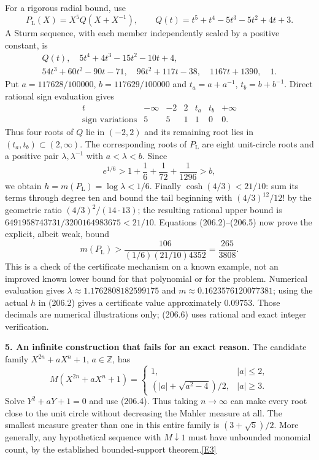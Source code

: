 \documentclass[11pt,a4paper]{article}
\newcommand{\Z}{\mathbb{Z}}
\newcommand{\eref}[2]{\hyperlink{extra:#1:#2}{[E#2]}}
\begin{document}
For a rigorous radial bound, use
\[
 P_\mathrm L(X)=X^5 Q(X+X^{-1}),\qquad
 Q(t)=t^5+t^4-5t^3-5t^2+4t+3.
\]
A Sturm sequence, with each member independently scaled by a positive
constant, is
\[
\begin{gathered}
 Q(t),\quad 5t^4+4t^3-15t^2-10t+4,\\
 54t^3+60t^2-90t-71,\quad96t^2+117t-38,
 \quad1167t+1390,\quad1.
\end{gathered}
\]
Put $a=117628/100000$, $b=117629/100000$ and
$t_a=a+a^{-1}$, $t_b=b+b^{-1}$. Direct rational sign evaluation gives
\[
\begin{array}{c|rrrrrr}
 t&-\infty&-2&2&t_a&t_b&+\infty\\\hline
 \text{sign variations}&5&5&1&1&0&0.
\end{array}
\]
Thus four roots of $Q$ lie in $(-2,2)$ and its remaining root lies in
$(t_a,t_b)\subset(2,\infty)$. The corresponding roots of $P_\mathrm L$
are eight unit-circle roots and a positive pair $\lambda,\lambda^{-1}$
with $a<\lambda<b$. Since
\[
 e^{1/6}>1+\frac16+\frac1{72}+\frac1{1296}>b,
\]
we obtain $h=m(P_\mathrm L)=\log\lambda<1/6$.
Finally $\cosh(4/3)<21/10$: sum its terms through degree ten and bound
the tail beginning with $(4/3)^{12}/12!$ by the geometric ratio
$(4/3)^2/(14\cdot13)$; the resulting rational upper bound is
$6491958743731/3200164983675<21/10$.
Equations (206.2)--(206.5) now prove the explicit, albeit weak, bound
\[
 m(P_\mathrm L)>\frac{106}{(1/6)(21/10)4352}
 =\frac{265}{3808}. \tag{206.6}
\]
This is a check of the certificate mechanism on a known example, not
an improved known lower bound for that polynomial or for the problem.
Numerical evaluation gives $\lambda\approx1.1762808182599175$ and
$m\approx0.1623576120077381$; using the actual $h$ in (206.2) gives a
certificate value approximately $0.09753$. Those decimals are numerical
illustrations only; (206.6) uses rational and exact integer verification.

\textbf{5. An infinite construction that fails for an exact reason.}
The candidate family $X^{2n}+aX^n+1$, $a\in\Z$, has
\[
 M(X^{2n}+aX^n+1)=
 \begin{cases}
 1,&|a|\le2,\\[2pt]
 (|a|+\sqrt{a^2-4})/2,&|a|\ge3.
 \end{cases}
\]
Solve $Y^2+aY+1=0$ and use (206.4). Thus taking $n\to\infty$ can
make every root close to the unit circle without decreasing the Mahler
measure at all. The smallest measure greater than one in this entire
family is $(3+\sqrt5)/2$. More generally, any hypothetical sequence
with $M\downarrow1$ must have unbounded monomial count, by the established
bounded-support theorem.\eref{206}{3}
\end{document}
